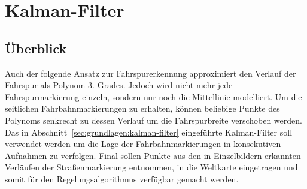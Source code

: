 \section{Kalman-Filter \dcsecondauthorshort}
\label{sec:fahrspurerkennung_kalman}

\subsection{Überblick} \label{ssec:fahrspurerkennung:kalman-filter:ueberblick}
Auch der folgende Ansatz zur Fahrspurerkennung approximiert den Verlauf der Fahrspur als Polynom 3. Grades. Jedoch wird nicht mehr jede Fahrspurmarkierung einzeln, sondern nur noch die Mittellinie modelliert. Um die seitlichen Fahrbahnmarkierungen zu erhalten, können beliebige Punkte des Polynoms senkrecht zu dessen Verlauf um die Fahrspurbreite verschoben werden.
Das in Abschnitt~\ref{sec:grundlagen:kalman-filter} eingeführte Kalman-Filter soll verwendet werden um die Lage der Fahrbahnmarkierungen in konsekutiven Aufnahmen zu verfolgen. Final sollen Punkte aus den in Einzelbildern erkannten Verläufen der Straßenmarkierung entnommen, in die Weltkarte eingetragen und somit für den Regelungsalgorithmus verfügbar gemacht werden.

